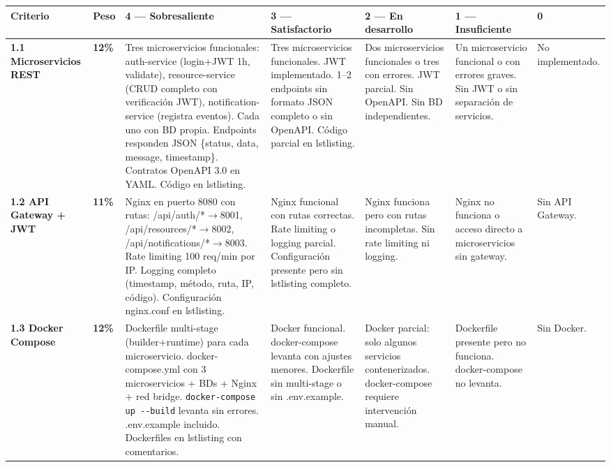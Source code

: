 \documentclass[11pt,a4paper,landscape]{article}
\begin{document}
	\begin{center}
		\footnotesize
		\begin{tabular}{|P{2.2cm}|C{1cm}|L{8.2cm}|L{3.8cm}|L{3.8cm}|L{3cm}|L{2cm}|}
			\hline
			\color{white}\textbf{Criterio} & \color{white}\textbf{Peso} &
			\color{white}\textbf{4 --- Sobresaliente} &
			\color{white}\textbf{3 --- Satisfactorio} &
			\color{white}\textbf{2 --- En desarrollo} &
			\color{white}\textbf{1 --- Insuficiente} &
			\color{white}\textbf{0}\\
			\hline
			
			\textbf{1.1 Microservicios REST} &
			\textbf{12\%} &
			Tres microservicios funcionales: auth-service (login+JWT 1h, validate), resource-service (CRUD completo con verificaci\'on JWT), notification-service (registra eventos). Cada uno con BD propia. Endpoints responden JSON \{status, data, message, timestamp\}. Contratos OpenAPI 3.0 en YAML. C\'odigo en lstlisting. &
			Tres microservicios funcionales. JWT implementado. 1--2 endpoints sin formato JSON completo o sin OpenAPI. C\'odigo parcial en lstlisting. &
			Dos microservicios funcionales o tres con errores. JWT parcial. Sin OpenAPI. Sin BD independientes. &
			Un microservicio funcional o con errores graves. Sin JWT o sin separaci\'on de servicios. &
			No implementado.\\
			\hline
			
			\textbf{1.2 API Gateway + JWT} &
			\textbf{11\%} &
			Nginx en puerto 8080 con rutas: /api/auth/*$\to$8001, /api/resources/*$\to$8002, /api/notifications/*$\to$8003. Rate limiting 100 req/min por IP. Logging completo (timestamp, m\'etodo, ruta, IP, c\'odigo). Configuraci\'on nginx.conf en lstlisting. &
			Nginx funcional con rutas correctas. Rate limiting o logging parcial. Configuraci\'on presente pero sin lstlisting completo. &
			Nginx funciona pero con rutas incompletas. Sin rate limiting ni logging. &
			Nginx no funciona o acceso directo a microservicios sin gateway. &
			Sin API Gateway.\\
			\hline
			
			\textbf{1.3 Docker Compose} &
			\textbf{12\%} &
			Dockerfile multi-stage (builder+runtime) para cada microservicio. docker-compose.yml con 3 microservicios + BDs + Nginx + red bridge. \texttt{docker-compose up -{}-build} levanta sin errores. .env.example incluido. Dockerfiles en lstlisting con comentarios. &
			Docker funcional. docker-compose levanta con ajustes menores. Dockerfile sin multi-stage o sin .env.example. &
			Docker parcial: solo algunos servicios contenerizados. docker-compose requiere intervenci\'on manual. &
			Dockerfile presente pero no funciona. docker-compose no levanta. &
			Sin Docker.\\
			\hline
		\end{tabular}
	\end{center}
	
\end{document}
